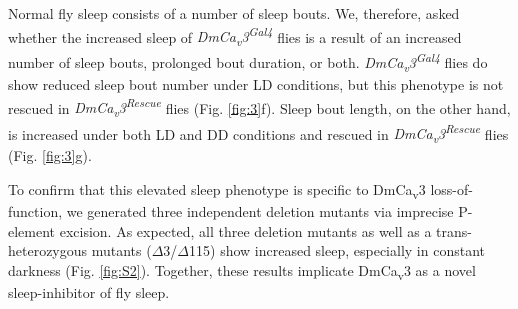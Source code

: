 Normal fly sleep consists of a number of sleep bouts.
We, therefore, asked whether the increased sleep of \emph{DmCa\textsubscript{v}3\textsuperscript{Gal4}} flies is a result of an increased number of sleep bouts, prolonged bout duration, or both.
\emph{DmCa\textsubscript{v}3\textsuperscript{Gal4}} flies do show reduced sleep bout number under LD conditions, but this phenotype is not rescued in \emph{DmCa\textsubscript{v}3\textsuperscript{Rescue}} flies (Fig. \ref{fig:3}f).
Sleep bout length, on the other hand, is increased under both LD and DD conditions and rescued in \emph{DmCa\textsubscript{v}3\textsuperscript{Rescue}} flies (Fig. \ref{fig:3}g).

To confirm that this elevated sleep phenotype is specific to DmCa\textsubscript{v}3 loss-of-function, we generated three independent deletion mutants via imprecise P-element excision.
As expected, all three deletion mutants as well as a trans-heterozygous mutants ($\Delta$3/$\Delta$115) show increased sleep, especially in constant darkness (Fig. \ref{fig:S2}).
Together, these results implicate DmCa\textsubscript{v}3 as a novel sleep-inhibitor of fly sleep.
